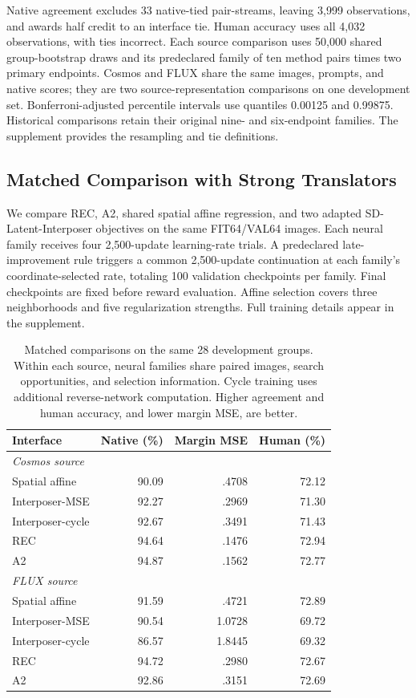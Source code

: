 \documentclass[10pt,twocolumn,letterpaper]{article}
\begin{document}
Native agreement excludes 33 native-tied pair-streams, leaving 3,999 observations, and awards half credit to an interface tie. Human accuracy uses all 4,032 observations, with ties incorrect. Each source comparison uses 50,000 shared group-bootstrap draws and its predeclared family of ten method pairs times two primary endpoints. Cosmos and FLUX share the same images, prompts, and native scores; they are two source-representation comparisons on one development set. Bonferroni-adjusted percentile intervals use quantiles 0.00125 and 0.99875. Historical comparisons retain their original nine- and six-endpoint families. The supplement provides the resampling and tie definitions.

\subsection{Matched Comparison with Strong Translators}
\label{sec:matched}
We compare REC, A2, shared spatial affine regression, and two adapted SD-Latent-Interposer objectives on the same FIT64/VAL64 images. Each neural family receives four 2,500-update learning-rate trials. A predeclared late-improvement rule triggers a common 2,500-update continuation at each family's coordinate-selected rate, totaling 100 validation checkpoints per family. Final checkpoints are fixed before reward evaluation. Affine selection covers three neighborhoods and five regularization strengths. Full training details appear in the supplement.

\begin{table}[t]
\centering\small
\begin{tabular}{lrrr}
\toprule
Interface & Native (\%) & Margin MSE & Human (\%)\\
\midrule
\multicolumn{4}{l}{\textit{Cosmos source}}\\
Spatial affine &90.09&.4708&72.12\\
Interposer-MSE &92.27&.2969&71.30\\
Interposer-cycle &92.67&.3491&71.43\\
REC &94.64&.1476&72.94\\
A2 &94.87&.1562&72.77\\
\midrule
\multicolumn{4}{l}{\textit{FLUX source}}\\
Spatial affine &91.59&.4721&72.89\\
Interposer-MSE &90.54&1.0728&69.72\\
Interposer-cycle &86.57&1.8445&69.32\\
REC &94.72&.2980&72.67\\
A2 &92.86&.3151&72.69\\
\bottomrule
\end{tabular}
\caption{Matched comparisons on the same 28 development groups. Within each source, neural families share paired images, search opportunities, and selection information. Cycle training uses additional reverse-network computation. Higher agreement and human accuracy, and lower margin MSE, are better.}
\label{tab:matched}
\end{table}
\end{document}
